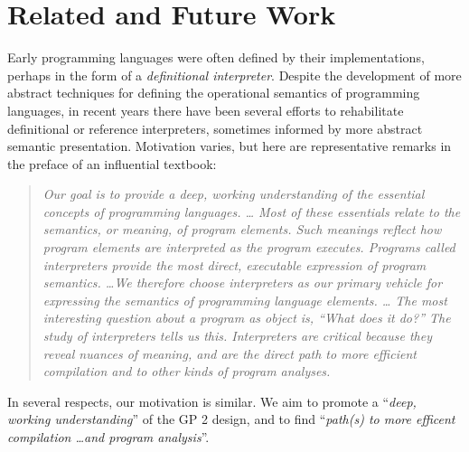 \section{Related and Future Work}
\label{sec:relatedandfuture}
Early programming languages were often defined by their implementations,
perhaps in the form of a \emph{definitional interpreter}.
Despite the development of more abstract techniques
for defining the operational semantics of programming languages, in recent years there
have been several efforts to rehabilitate definitional or
reference interpreters, sometimes informed by more abstract semantic
presentation.
Motivation varies, but here are representative remarks in the preface
of an influential textbook: 
\begin{quote}
\textit{Our goal is to provide a deep, working understanding of the essential concepts of programming languages. \ldots
Most of these essentials relate to the semantics, or meaning, of program elements. Such meanings reflect how program elements are interpreted as the program executes. Programs called interpreters provide the most direct, executable expression of program semantics. \ldots We therefore choose interpreters as our primary vehicle for expressing the semantics of programming language elements. \ldots
The most interesting question about a program as object is, \textnormal{``What does it do?''} The study of interpreters tells us this. Interpreters are critical because they reveal nuances of meaning, and are the direct path to more efficient compilation and to other kinds of program analyses.} \cite{Friedmanetal2008}
\end{quote}
In several respects, our motivation is similar.  We aim to promote a ``\textit{deep, working understanding}'' of the GP 2 design, and to find ``\textit{path(s) to more efficent compilation \ldots and program analysis}''.

